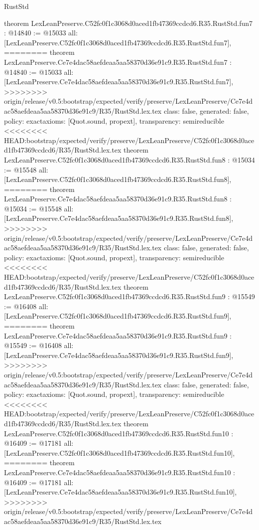 \begin{lexlean}{RustStd}
\begin{coremodule}
{\begin{coremodule}
{{{{{{{{{theorem LexLeanPreserve.C52fc0f1c3068d0aced1fb47369ccdcd6.R35.RustStd.fun7 : @14840 := @15033 {
  all: [LexLeanPreserve.C52fc0f1c3068d0aced1fb47369ccdcd6.R35.RustStd.fun7],
========
theorem LexLeanPreserve.Ce7e4dac58aefdeaa5aa58370d36e91c9.R35.RustStd.fun7 : @14840 := @15033 {
  all: [LexLeanPreserve.Ce7e4dac58aefdeaa5aa58370d36e91c9.R35.RustStd.fun7],
>>>>>>>> origin/release/v0.5:bootstrap/expected/verify/preserve/LexLeanPreserve/Ce7e4dac58aefdeaa5aa58370d36e91c9/R35/RustStd.lex.tex
  class: false,
  generated: false,
  policy: exact{axioms: [Quot.sound, propext]},
  transparency: semireducible
}
<<<<<<<< HEAD:bootstrap/expected/verify/preserve/LexLeanPreserve/C52fc0f1c3068d0aced1fb47369ccdcd6/R35/RustStd.lex.tex
theorem LexLeanPreserve.C52fc0f1c3068d0aced1fb47369ccdcd6.R35.RustStd.fun8 : @15034 := @15548 {
  all: [LexLeanPreserve.C52fc0f1c3068d0aced1fb47369ccdcd6.R35.RustStd.fun8],
========
theorem LexLeanPreserve.Ce7e4dac58aefdeaa5aa58370d36e91c9.R35.RustStd.fun8 : @15034 := @15548 {
  all: [LexLeanPreserve.Ce7e4dac58aefdeaa5aa58370d36e91c9.R35.RustStd.fun8],
>>>>>>>> origin/release/v0.5:bootstrap/expected/verify/preserve/LexLeanPreserve/Ce7e4dac58aefdeaa5aa58370d36e91c9/R35/RustStd.lex.tex
  class: false,
  generated: false,
  policy: exact{axioms: [Quot.sound, propext]},
  transparency: semireducible
}
<<<<<<<< HEAD:bootstrap/expected/verify/preserve/LexLeanPreserve/C52fc0f1c3068d0aced1fb47369ccdcd6/R35/RustStd.lex.tex
theorem LexLeanPreserve.C52fc0f1c3068d0aced1fb47369ccdcd6.R35.RustStd.fun9 : @15549 := @16408 {
  all: [LexLeanPreserve.C52fc0f1c3068d0aced1fb47369ccdcd6.R35.RustStd.fun9],
========
theorem LexLeanPreserve.Ce7e4dac58aefdeaa5aa58370d36e91c9.R35.RustStd.fun9 : @15549 := @16408 {
  all: [LexLeanPreserve.Ce7e4dac58aefdeaa5aa58370d36e91c9.R35.RustStd.fun9],
>>>>>>>> origin/release/v0.5:bootstrap/expected/verify/preserve/LexLeanPreserve/Ce7e4dac58aefdeaa5aa58370d36e91c9/R35/RustStd.lex.tex
  class: false,
  generated: false,
  policy: exact{axioms: [Quot.sound, propext]},
  transparency: semireducible
}
<<<<<<<< HEAD:bootstrap/expected/verify/preserve/LexLeanPreserve/C52fc0f1c3068d0aced1fb47369ccdcd6/R35/RustStd.lex.tex
theorem LexLeanPreserve.C52fc0f1c3068d0aced1fb47369ccdcd6.R35.RustStd.fun10 : @16409 := @17181 {
  all: [LexLeanPreserve.C52fc0f1c3068d0aced1fb47369ccdcd6.R35.RustStd.fun10],
========
theorem LexLeanPreserve.Ce7e4dac58aefdeaa5aa58370d36e91c9.R35.RustStd.fun10 : @16409 := @17181 {
  all: [LexLeanPreserve.Ce7e4dac58aefdeaa5aa58370d36e91c9.R35.RustStd.fun10],
>>>>>>>> origin/release/v0.5:bootstrap/expected/verify/preserve/LexLeanPreserve/Ce7e4dac58aefdeaa5aa58370d36e91c9/R35/RustStd.lex.tex
}}}}}}}}}}}}}}
\end{coremodule}}
\end{coremodule}
\end{lexlean}
